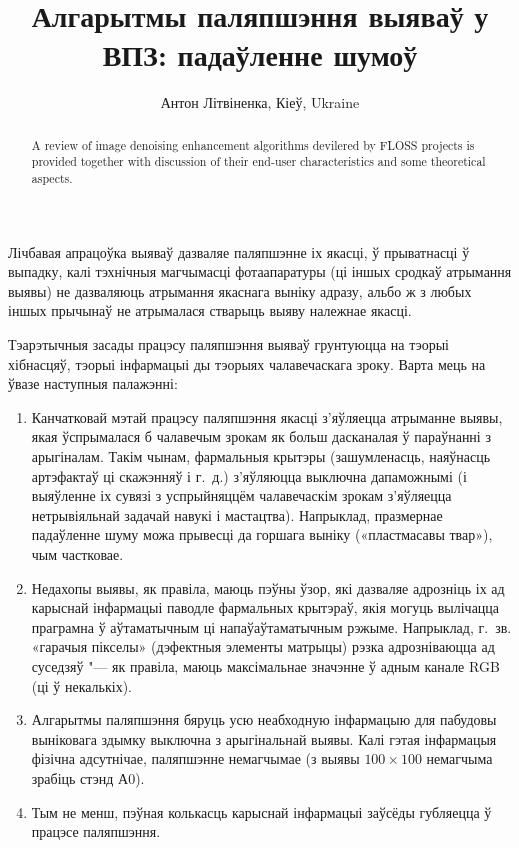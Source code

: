 \documentclass[10pt, a5paper]{article}
\begin{document}
\title{Алгарытмы паляпшэння выяваў у ВПЗ: падаўленне шумоў}
\author{Антон Літвіненка, Кіеў, Ukraine}
\maketitle
\begin{abstract}
A review of image denoising enhancement algorithms devilered by FLOSS projects is provided together with discussion of their end-user characteristics and some theoretical aspects.
\end{abstract}
Лічбавая апрацоўка выяваў дазваляе паляпшэнне іх якасці, ў прыватнасці ў выпадку, калі тэхнічныя магчымасці фотаапаратуры (ці іншых сродкаў атрымання выявы) не дазваляюць атрымання якаснага выніку адразу, альбо ж з любых іншых прычынаў не атрымалася стварыць выяву належнае якасці.

Тэарэтычныя засады працэсу паляпшэння выяваў грунтуюцца на тэорыі хібнасцяў, тэорыі інфармацыі ды тэорыях чалавечаскага зроку. Варта мець на ўвазе наступныя палажэнні:

\begin{enumerate}
  \item Канчатковай мэтай працэсу паляпшэння якасці з’яўляецца атрыманне выявы, якая ўспрымалася б чалавечым зрокам як больш дасканалая ў параўнанні з арыгіналам. Такім чынам, фармальныя крытэры (зашумленасць, наяўнасць артэфактаў ці скажэнняў і г.~д.) з’яўляюцца выключна дапаможнымі (і выяўленне іх сувязі з успрыйняццём чалавечаскім зрокам з’яўляецца нетрывіяльнай задачай навукі і мастацтва). Напрыклад, празмернае падаўленне шуму можа прывесці да горшага выніку  («пластмасавы твар»), чым частковае.
  \item Недахопы выявы, як правіла, маюць пэўны ўзор, які дазваляе адрозніць іх ад карыснай інфармацыі паводле фармальных крытэраў, якія могуць вылічацца праграмна ў аўтаматычным ці напаўаўтаматычным рэжыме. Напрыклад, г.~зв. «гарачыя пікселы» (дэфектныя элементы матрыцы) рэзка адрозніваюцца ад суседзяў "--- як правіла, маюць максімальнае значэнне ў адным канале RGB (ці ў некалькіх).
  \item Алгарытмы паляпшэння бяруць усю неабходную інфармацыю для пабудовы выніковага здымку выключна з арыгінальнай выявы. Калі гэтая інфармацыя фізічна адсутнічае, паляпшэнне немагчымае (з выявы $100\times100$ немагчыма зрабіць стэнд А0).
  \item Тым не менш, пэўная колькасць карыснай інфармацыі заўсёды губляецца ў працэсе паляпшэння.
\end{enumerate}
\end{document}
